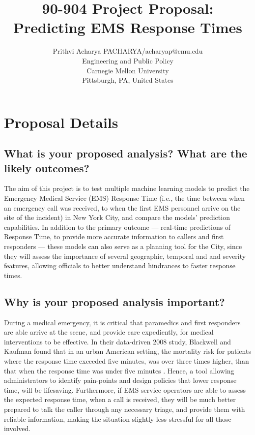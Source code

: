 \documentclass[twoside,11pt]{article}
\begin{document}
\title{90-904 Project Proposal: Predicting EMS Response Times}

\author{\name Prithvi Acharya \email PACHARYA/acharyap@cmu.edu \\
       \addr Engineering and Public Policy\\
       Carnegie Mellon University\\
       Pittsburgh, PA, United States \\
       }
       
\maketitle
\section{Proposal Details} \label{details}
\subsection{What is your proposed analysis? What are the likely outcomes?}
The aim of this project is to test multiple machine learning models to predict the Emergency Medical Service (EMS) Response Time (i.e., the time between when an emergency call was received, to when the first EMS personnel arrive on the site of the incident) in New York City, and compare the models' prediction capabilities. In addition to the primary outcome --- real-time predictions of Response Time, to provide more accurate information to callers and first responders --- these models can also serve as a planning tool for the City, since they will assess the importance of several geographic, temporal and and severity features, allowing officials to better understand hindrances to faster response times.

\subsection{Why is your proposed analysis important?}
During a medical emergency, it is critical that paramedics and first responders are able arrive at the scene, and provide care expediently, for medical interventions to be effective. In their data-driven 2008 study, Blackwell and Kaufman found that in an urban American setting, the mortality risk for patients where the response time exceeded five minutes, was over three times higher, than that when the response time was under five minutes \cite{blackwellrte}. Hence, a tool allowing administrators to identify pain-points and design policies that lower response time, will be lifesaving. Furthermore, if EMS service operators are able to assess the expected response time, when a call is received, they will be much better prepared to talk the caller through any necessary triage, and provide them with reliable information, making the situation slightly less stressful for all those involved.
\end{document}
